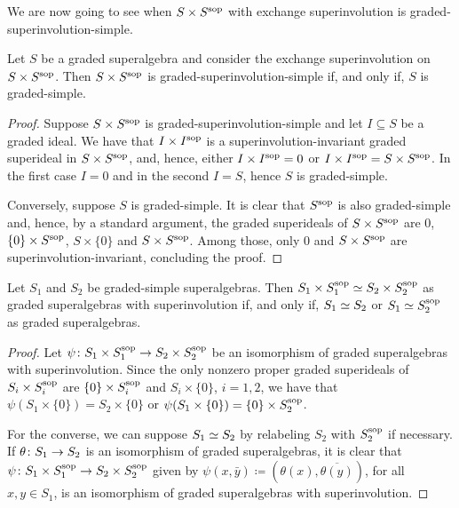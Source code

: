 We are now going to see when $S\times S^{\mathrm{sop}}$ with exchange superinvolution is graded-superinvolution-simple.

\begin{lemma}\label{lemma:SxSsop-simple}
	Let $S$ be a graded superalgebra and consider the exchange superinvolution on $S \times S^{\mathrm{sop}}$. 
	Then $S \times S^{\mathrm{sop}}$ is graded-superinvolution-simple if, and only if, $S$ is graded-simple. 
\end{lemma}

\begin{proof}
    Suppose $S \times S^{\mathrm{sop}}$ is graded-superinvolution-simple and let $I \subseteq S$ be a graded ideal. 
    We have that $I \times I^{\mathrm{sop}}$ is a superinvolution-invariant graded superideal in $S \times S^{\mathrm{sop}}$, and, hence, either $I \times I^{\mathrm{sop}} = 0$ or $I \times I^{\mathrm{sop}} = S \times S^{\mathrm{sop}}$. 
    In the first case $I = 0$ and in the second $I = S$, hence $S$ is graded-simple. 
    
    Conversely, suppose $S$ is graded-simple. 
    It is clear that $S^{\mathrm{sop}}$ is also graded-simple and, hence, by a standard argument, the graded superideals of $S \times S^{\mathrm{sop}}$ are $0$, $\{ 0 \} \times S^{\mathrm{sop}}$, $S \times \{ 0 \}$ and $S\times S^{\mathrm{sop}}$. 
    Among those, only $0$ and $S\times S^{\mathrm{sop}}$ are superinvolution-invariant, concluding the proof. 
\end{proof}

\begin{lemma}\label{lemma:iso-SxSsop}
    Let $S_1$ and $S_2$ be graded-simple superalgebras. 
    Then $S_1\times S_1^{\mathrm{sop}} \simeq S_2\times S_2^{\mathrm{sop}}$ as graded superalgebras with superinvolution if, and only if, $S_1 \simeq S_2$ or $S_1 \simeq S_2^{\mathrm{sop}}$ as graded superalgebras.
\end{lemma}

\begin{proof}
    Let $\psi\colon S_1\times S_1^{\mathrm{sop}} \to S_2\times S_2^{\mathrm{sop}}$ be an isomorphism of graded superalgebras with superinvolution. 
    Since the only nonzero proper graded superideals of $S_i \times S_i^{\mathrm{sop}}$ are $\{ 0 \} \times S_i^{\mathrm{sop}}$ and $S_i\times \{ 0 \}$, $i = 1,2$, we have that $\psi(S_1\times \{ 0 \}) = S_2\times \{ 0 \}$ or $\psi(S_1\times \{ 0 \}) = \{ 0 \} \times S_2^{\mathrm{sop}}$.  
    
    For the converse, we can suppose $S_1 \simeq S_2$ by relabeling $S_2$ with $S_2^{\mathrm{sop}}$ if necessary. 
    If $\theta \colon S_1 \to S_2$ is an isomorphism of graded superalgebras, it is clear that $\psi\colon S_1\times S_1^{\mathrm{sop}} \to S_2\times S_2^{\mathrm{sop}}$ given by $\psi (x, \bar {y}) \coloneqq (\theta(x), \overline{\theta(y)})$, for all $x,y \in S_1$, is an isomorphism of graded superalgebras with superinvolution. 
\end{proof}

